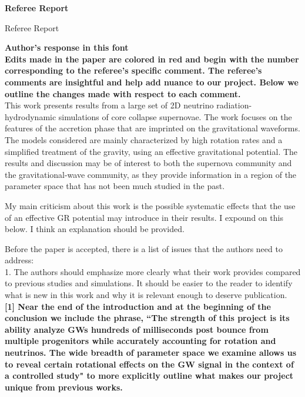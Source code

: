 \documentclass[11pt]{article}
\begin{document}
\setcounter{page}{1}  \renewcommand{\thepage}
           {Ref Report-- \arabic{page}}%

\begin{center}
{\bf Referee Report} \vspace{-0.2in}
\end{center}

Referee Report 

\textbf{Author's response in this font}\\

\textbf{Edits made in the paper are colored in red and begin with the number corresponding to the referee's specific comment.  The referee's comments are insightful and help add nuance to our project.  Below we outline the changes made with respect to each comment.}\\

This work presents results from a large set of 2D neutrino radiation-hydrodynamic simulations of core collapse supernovae. The work focuses on the features of the accretion phase that are imprinted on the gravitational waveforms. The models considered are mainly characterized by high rotation rates and a simplified treatment of the gravity, using an effective gravitational potential. The results and discussion may be of interest to both the supernova community and the gravitational-wave community, as they provide information in a region of the parameter space that has not been much studied in the past.

My main criticism about this work is the possible systematic effects that the 
use of an effective GR potential may introduce in their results. I expound on
this below. I think an explanation should be provided.

Before the paper is accepted, there is a list of issues that the authors need to 
address:\\

1. The authors should emphasize more clearly what their work provides compared to previous studies and simulations. It should be easier to the reader to identify what is new in this work and why it is relevant enough to deserve publication.\\

\textbf{[1] Near the end of the introduction and at the beginning of the conclusion we include the phrase, ``The strength of this project is its ability analyze GWs hundreds of milliseconds post bounce from multiple progenitors while accurately accounting for rotation and neutrinos.  The wide breadth of parameter space we examine allows us to reveal certain rotational effects on the GW signal in the context of a controlled study" to more explicitly outline what makes our project unique from previous works.}\\
\end{document}
